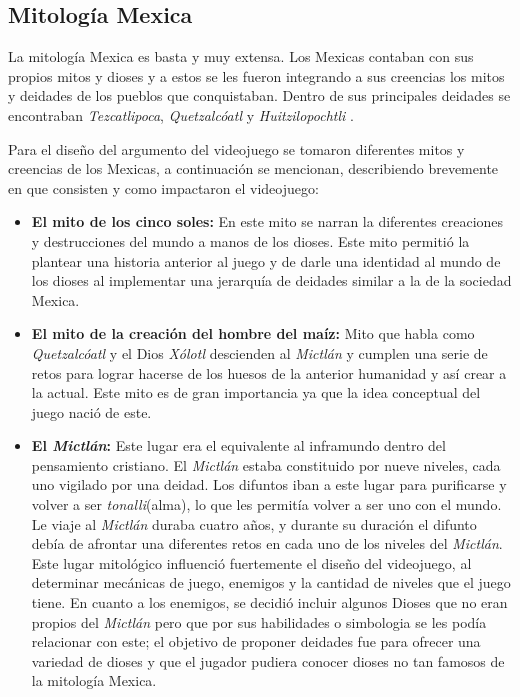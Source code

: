 	 \subsection{Mitología Mexica} 
	 La mitología Mexica es basta y muy extensa. Los Mexicas contaban con sus propios 
	 mitos y dioses y a estos se les fueron integrando a sus creencias los mitos y
	  deidades de los pueblos que conquistaban. Dentro de sus principales deidades 
	  se encontraban \textit{Tezcatlipoca}, \textit{Quetzalcóatl} y 
	  \textit{Huitzilopochtli} \cite{RefMexicasSol}.
	 \\
	 \par
	 Para el diseño del argumento del videojuego se tomaron diferentes mitos y creencias
	 de los Mexicas, a continuación se mencionan, describiendo brevemente en que
	 consisten y como impactaron el videojuego:
	 \begin{itemize}
		\item \textbf{El mito de los cinco soles:} En este mito se narran la diferentes 
		creaciones y destrucciones del mundo a manos de los dioses\cite{RefMexicasMito}. 
		Este mito permitió la plantear una historia anterior al juego y de darle una 
		identidad al mundo de los dioses al implementar una jerarquía de deidades 
		similar a la de la sociedad Mexica.
		\item \textbf{El mito de la creación del hombre del maíz:} Mito que habla como 
		\textit{Quetzalcóatl} y el Dios \textit{Xólotl} descienden al \textit{Mictlán}
		 y cumplen una serie de retos para lograr hacerse de los huesos de la anterior 
		 humanidad y así crear a la actual\cite{RefMexicasMito}. Este mito es de gran 
		 importancia ya que la idea conceptual del juego nació de este.
		\item \textbf{El \textit{Mictlán}:} Este lugar era el equivalente al inframundo
		dentro del pensamiento cristiano. El \textit{Mictlán} estaba constituido por 
		nueve niveles, cada uno vigilado por una deidad. Los difuntos iban a este lugar 
		para purificarse y volver a ser \textit{tonalli}(alma), lo que les permitía 
		volver a ser uno con el mundo. Le viaje al \textit{Mictlán} duraba cuatro años, 
		y durante su duración el difunto debía de afrontar una diferentes retos en 
		cada uno de los niveles del \textit{Mictlán}\cite{RefMexicasSol}. Este lugar 
		mitológico influenció fuertemente el diseño del videojuego, al determinar 
		mecánicas de juego, enemigos y la cantidad de niveles que el juego tiene. En 
		cuanto a los enemigos, se decidió incluir algunos Dioses que no eran propios 
		del \textit{Mictlán} pero que por sus habilidades o simbologia se les podía 
		relacionar con este; el objetivo de proponer deidades fue para ofrecer una 
		variedad de dioses y que el jugador pudiera conocer dioses no tan famosos de la 
		mitología Mexica.    
	 \end{itemize}	 
	 

